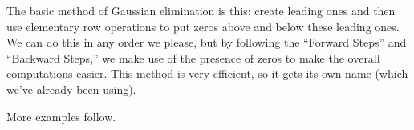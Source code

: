 

The basic method of Gaussian elimination is this: create leading ones and then use elementary row operations to put zeros above and below these leading ones. We can do this in any order we please, but by following the ``Forward Steps'' and ``Backward Steps,'' we make use of the presence of zeros to make the overall computations easier. This method is very efficient, so it gets its own name (which we've already been using).


\noindent More examples follow.\\

